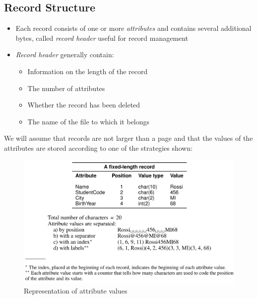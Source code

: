 \subsection{Record Structure}
\begin{itemize}
    \item Each record consists of one or more \textit{attributes} and contains several additional bytes, called \textit{record header} useful for record management
    \item \textit{Record header} generally contain:
    \begin{itemize}
        \item Information on the length of the record
        \item The number of attributes
        \item Whether the record has been deleted
        \item The name of the file to which it belongs
    \end{itemize}
\end{itemize}
We will assume that records are not larger than a page and that the values of the attributes are stored according to one of the strategies shown:
\begin{figure}[!h]
        \centering
        \includegraphics[width=0.7\linewidth]{images/DBMS_Internals/attribute_values.jpeg}
        \caption{Representation of attribute values}
    \end{figure}

\newpage
